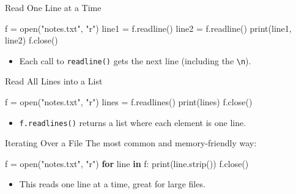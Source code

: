 \documentclass[
  letterpaper,
  DIV=11,
  numbers=noendperiod]{scrreprt}
\newenvironment{Shaded}{\begin{snugshade}}{\end{snugshade}}
\newcommand{\BuiltInTok}[1]{\textcolor[rgb]{0.00,0.23,0.31}{#1}}
\newcommand{\ControlFlowTok}[1]{\textcolor[rgb]{0.00,0.23,0.31}{\textbf{#1}}}
\newcommand{\KeywordTok}[1]{\textcolor[rgb]{0.00,0.23,0.31}{\textbf{#1}}}
\newcommand{\NormalTok}[1]{\textcolor[rgb]{0.00,0.23,0.31}{#1}}
\newcommand{\OperatorTok}[1]{\textcolor[rgb]{0.37,0.37,0.37}{#1}}
\newcommand{\StringTok}[1]{\textcolor[rgb]{0.13,0.47,0.30}{#1}}
\providecommand{\tightlist}{%
  \setlength{\itemsep}{0pt}\setlength{\parskip}{0pt}}
\begin{document}
Read One Line at a Time

\begin{Shaded}
\begin{Highlighting}[]
\NormalTok{f }\OperatorTok{=} \BuiltInTok{open}\NormalTok{(}\StringTok{"notes.txt"}\NormalTok{, }\StringTok{"r"}\NormalTok{)}
\NormalTok{line1 }\OperatorTok{=}\NormalTok{ f.readline()}
\NormalTok{line2 }\OperatorTok{=}\NormalTok{ f.readline()}
\BuiltInTok{print}\NormalTok{(line1, line2)}
\NormalTok{f.close()}
\end{Highlighting}
\end{Shaded}

\begin{itemize}
\tightlist
\item
  Each call to \texttt{readline()} gets the next line (including the
  \texttt{\textbackslash{}n}).
\end{itemize}

Read All Lines into a List

\begin{Shaded}
\begin{Highlighting}[]
\NormalTok{f }\OperatorTok{=} \BuiltInTok{open}\NormalTok{(}\StringTok{"notes.txt"}\NormalTok{, }\StringTok{"r"}\NormalTok{)}
\NormalTok{lines }\OperatorTok{=}\NormalTok{ f.readlines()}
\BuiltInTok{print}\NormalTok{(lines)}
\NormalTok{f.close()}
\end{Highlighting}
\end{Shaded}

\begin{itemize}
\tightlist
\item
  \texttt{f.readlines()} returns a list where each element is one line.
\end{itemize}

Iterating Over a File The most common and memory-friendly way:

\begin{Shaded}
\begin{Highlighting}[]
\NormalTok{f }\OperatorTok{=} \BuiltInTok{open}\NormalTok{(}\StringTok{"notes.txt"}\NormalTok{, }\StringTok{"r"}\NormalTok{)}
\ControlFlowTok{for}\NormalTok{ line }\KeywordTok{in}\NormalTok{ f:}
    \BuiltInTok{print}\NormalTok{(line.strip())}
\NormalTok{f.close()}
\end{Highlighting}
\end{Shaded}

\begin{itemize}
\tightlist
\item
  This reads one line at a time, great for large files.
\end{itemize}
\end{document}
